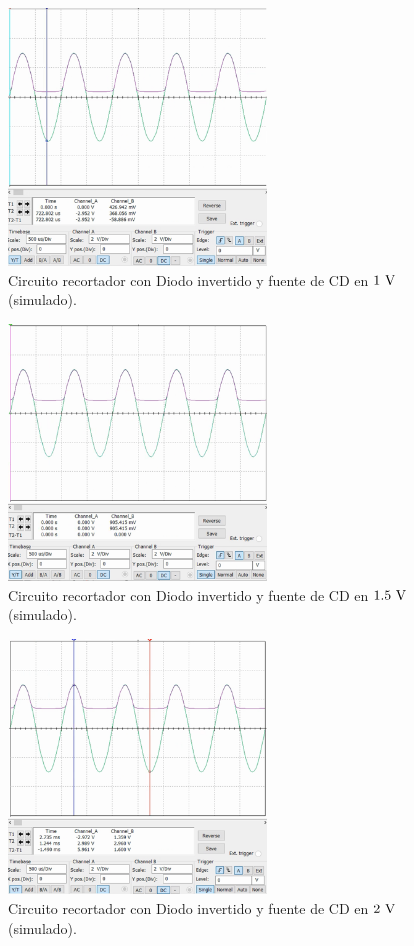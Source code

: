 \documentclass[journal]{IEEEtran}
\begin{document}
\begin{figure}[H]
        \centering
        \includegraphics[width=2.7in]{SignalSimulated_12.png}
        \caption{Circuito recortador con Diodo invertido y fuente de CD en $1~\textnormal{V}$ (simulado).}
        \label{fig:SignalSimulated_12}
\end{figure}
\begin{figure}[H]
        \centering
        \includegraphics[width=2.7in]{SignalSimulated_13.png}
        \caption{Circuito recortador con Diodo invertido y fuente de CD en $1.5~\textnormal{V}$ (simulado).}
        \label{fig:SignalSimulated_13}
\end{figure}
\begin{figure}[H]
        \centering
        \includegraphics[width=2.7in]{SignalSimulated_14.png}
        \caption{Circuito recortador con Diodo invertido y fuente de CD en $2~\textnormal{V}$ (simulado).}
        \label{fig:SignalSimulated_14}
\end{figure}
\end{document}
